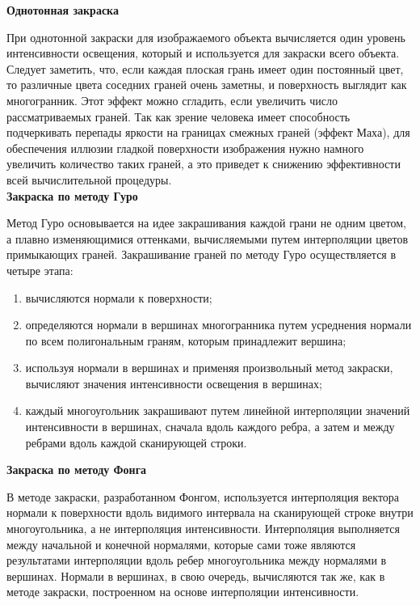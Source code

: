 \textbf{Однотонная закраска}

При однотонной закраски для изображаемого объекта вычисляется один уровень интенсивности освещения, который и используется для закраски всего объекта. Следует заметить, что, если каждая плоская грань имеет один постоянный цвет, то различные цвета соседних граней очень заметны, и поверхность выглядит как многогранник. Этот эффект можно сгладить, если увеличить число рассматриваемых граней. Так как зрение человека имеет способность подчеркивать перепады яркости на границах смежных граней (эффект Маха), для обеспечения иллюзии гладкой поверхности изображения нужно намного увеличить количество таких граней, а это приведет к снижению эффективности всей вычислительной процедуры.\\

\textbf{Закраска по методу Гуро}

Метод Гуро основывается на идее закрашивания каждой грани не одним цветом, а плавно изменяющимися оттенками, вычисляемыми путем интерполяции цветов примыкающих граней. Закрашивание граней по методу Гуро осуществляется в четыре этапа:

\begin{enumerate}[label={\arabic*)}]
	\item вычисляются нормали к поверхности;
	\item определяются нормали в вершинах многогранника путем усреднения нормали по всем полигональным граням, которым принадлежит вершина;
	\item используя нормали в вершинах и применяя произвольный метод закраски, вычисляют значения интенсивности освещения в вершинах;
	\item каждый многоугольник закрашивают путем линейной интерполяции значений интенсивности в вершинах, сначала вдоль каждого ребра, а затем и между ребрами вдоль каждой сканирующей строки.
\end{enumerate}

\leavevmode

\textbf{Закраска по методу Фонга}

В методе закраски, разработанном Фонгом, используется интерполяция вектора нормали к поверхности вдоль видимого интервала на сканирующей строке внутри многоугольника, а не интерполяция интенсивности. Интерполяция выполняется между начальной и конечной нормалями, которые сами тоже являются результатами интерполяции вдоль ребер многоугольника между нормалями в вершинах. Нормали в вершинах, в свою очередь, вычисляются так же, как в методе закраски, построенном на основе интерполяции интенсивности.~\cite{FILL_FACES}

